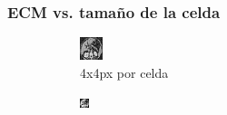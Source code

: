 \documentclass[11pt]{beamer}
\begin{document}
\begin{frame}
    \frametitle{ECM vs. tamaño de la celda}
    \begin{figure}[H]
    \centering
    \begin{subfigure}[h]{0.30\textwidth}
        \includegraphics[width=\textwidth]{img/tomo_granu_4.png}
        \caption{4x4px por celda}
        \label{fig:reconstruccion 4 px}
    \end{subfigure}%
    \hfill
    \begin{subfigure}[h]{0.30\textwidth}
            \includegraphics[width=\textwidth]{img/tomo_granu_10.png}

\end{subfigure}
\end{figure}
\end{frame}
\end{document}
